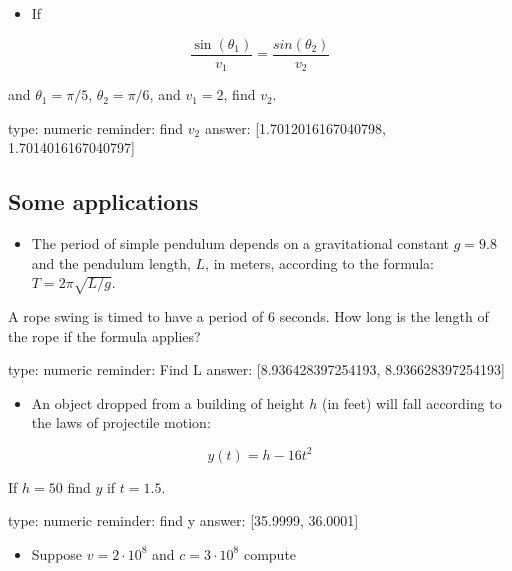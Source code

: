 \documentclass[12pt]{article}
\begin{document}
\begin{itemize}
\itemsep1pt\parskip0pt
\item
  If
\end{itemize}

\[
\frac{\sin(\theta_1)}{v_1} = \frac{sin(\theta_2)}{v_2}
\]

and $\theta_1 = \pi/5$, $\theta_2 = \pi/6$, and $v_1=2$, find $v_2$.

\begin{answer}
    type: numeric
    reminder: find \(v_2\)
    answer: [1.7012016167040798, 1.7014016167040797]

\end{answer}

\subsection{Some applications}

\begin{itemize}
\itemsep1pt\parskip0pt
\item
  The period of simple pendulum depends on a gravitational constant
  $g=9.8$ and the pendulum length, $L$, in meters, according to the
  formula: $T=2\pi\sqrt{L/g}$.
\end{itemize}

A rope swing is timed to have a period of $6$ seconds. How long is the
length of the rope if the formula applies?

\begin{answer}
    type: numeric
    reminder: Find L
    answer: [8.936428397254193, 8.936628397254193]

\end{answer}

\begin{itemize}
\itemsep1pt\parskip0pt
\item
  An object dropped from a building of height $h$ (in feet) will fall
  according to the laws of projectile motion:
\end{itemize}

\[
y(t) = h - 16t^2
\]

If $h=50$ find $y$ if $t=1.5$.

\begin{answer}
    type: numeric
    reminder: find y
    answer: [35.9999, 36.0001]

\end{answer}

\begin{itemize}
\itemsep1pt\parskip0pt
\item
  Suppose $v = 2\cdot 10^8$ and $c = 3 \cdot 10^8$ compute
\end{itemize}
\end{document}

